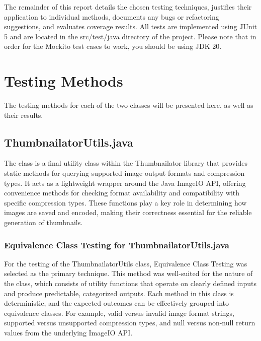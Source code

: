 \documentclass[12pt]{article}
\begin{document}
    The remainder of this report details the chosen testing techniques,
        justifies their application to individual methods, documents any bugs or
        refactoring suggestions, and evaluates coverage results.
    All tests are implemented using JUnit 5 and are located in the src/test/java
        directory of the project.  Please note that in order for the Mockito test
        cases to work, you should be using JDK 20.

    \section{Testing Methods}
    \markboth{}{}

    The testing methods for each of the two classes will be presented here, as
        well as their results.

    \subsection{ThumbnailatorUtils.java}
    \markboth{}{}

    The  class is a final utility class within the
        Thumbnailator library that provides static methods for querying
        supported image output formats and compression types.
    It acts as a lightweight wrapper around the Java ImageIO API, offering
        convenience methods for checking format availability and compatibility
        with specific compression types.
    These functions play a key role in determining how images are saved and
        encoded, making their correctness essential for the reliable generation
        of thumbnails.

    \subsubsection{Equivalence Class Testing for ThumbnailatorUtils.java}
    \markboth{}{}

    For the testing of the ThumbnailatorUtils class, Equivalence Class Testing
        was selected as the primary technique.
    This method was well-suited for the nature of the class, which consists of
        utility functions that operate on clearly defined inputs and produce
        predictable, categorized outputs.
    Each method in this class is deterministic, and the expected outcomes can be
        effectively grouped into equivalence classes. For example, valid
        versus invalid image format strings, supported versus unsupported
        compression types, and null versus non-null return values from the
        underlying ImageIO API.
\end{document}
